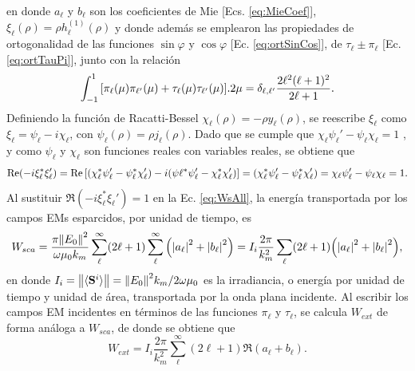 en donde $a_\ell$ y $b_\ell$ son los coeficientes de Mie [Ecs.  \eqref{eq:MieCoef}], $\xi_\ell(\rho) = \rho h_\ell^{(1)}(\rho)$ y donde además se emplearon las propiedades de ortogonalidad de las funciones $\sin\varphi$ y $\cos\varphi$ [Ec. \eqref{eq:ortSinCos}], de $\tau_\ell\pm\pi_\ell$ [Ec. \eqref{eq:ortTauPi}], junto con la relación \cite{bohren1998absorption}
	\begin{equation*}
	 \int_{-1}^{1}\qty[\pi_\ell(\mu)\pi_{\ell'}(\mu) + \tau_\ell(\mu)\tau_{\ell'}(\mu)].2\mu
 			= \delta_{\ell,\ell'} \frac{2\ell^2(\ell+1)^2}{2\ell+1}.
	 \end{equation*} 
Definiendo la función de Racatti-Bessel $\chi_\ell (\rho) = -\rho y_\ell(\rho)$, se reescribe $\xi_\ell$ como $\xi_\ell= \psi_\ell-i\chi_\ell$, con $\psi_\ell(\rho) = \rho j_\ell(\rho)$. Dado que se cumple que $\chi_\ell\psi_\ell'-\psi_\ell\chi_\ell = 1$ \cite{bohren1998absorption}, y como $\psi_\ell$ y $\chi_\ell$ son funciones reales con variables reales, se obtiene que
\begin{equation*}
\Re(-i\xi_\ell^*\xi_\ell')=\Re\qty[(\chi_\ell^*\psi_\ell'-\psi_\ell^*\chi_\ell')
						-i(\psi\ell^*\psi_\ell'-\chi_\ell^*\chi_\ell') ] 
						= (\chi_\ell^*\psi_\ell'-\psi_\ell^*\chi_\ell') 
						= \chi_\ell\psi_\ell'-\psi_\ell\chi_\ell = 1.
\end{equation*}
Al sustituir $\Re(-i\xi_\ell^*\xi_\ell') = 1$ en la Ec. \eqref{eq:WsAll}, la energía transportada por los campos EMs esparcidos, por unidad de tiempo, es
\begin{equation}
W_{sca} = \frac{\pi\norm{E_0}^2}{\omega\mu_0 k_m}
		\sum_\ell^\infty (2\ell+1) \sum_\ell^\infty\qty(\abs{a_\ell}^2+\abs{b_\ell}^2) = I_i \frac{2\pi}{k_m^2}  \sum_\ell (2\ell+1) \qty(\abs{a_\ell}^2+\abs{b_\ell}^2),
\end{equation}
en donde $I_i = \norm{\langle\vb{S}^i\rangle} = \norm{E_0}^2k_m/2\omega\mu_0$ es la irradiancia, o energía por unidad de tiempo y unidad de área, transportada por la onda plana incidente. Al escribir los campos EM incidentes en términos de las funciones $\pi_\ell$ y $\tau_\ell$, se calcula $W_{ext}$ de forma análoga a $W_{sca}$, de donde se obtiene que
\begin{equation}
W_{ext} = I_i \frac{2\pi}{k_m^2}  \sum_\ell^\infty (2\ell+1) \Re(a_\ell + b_\ell).
\end{equation}

